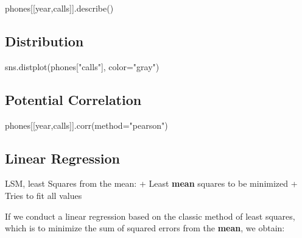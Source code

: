 \documentclass[
  letterpaper,
]{scrbook}
\newenvironment{Shaded}{\begin{snugshade}}{\end{snugshade}}
\newcommand{\NormalTok}[1]{\textcolor[rgb]{0.00,0.23,0.31}{#1}}
\newcommand{\OperatorTok}[1]{\textcolor[rgb]{0.37,0.37,0.37}{#1}}
\newcommand{\StringTok}[1]{\textcolor[rgb]{0.13,0.47,0.30}{#1}}
\begin{document}
\begin{Shaded}
\begin{Highlighting}[]
\NormalTok{phones[[}\StringTok{\textquotesingle{}year\textquotesingle{}}\NormalTok{,}\StringTok{\textquotesingle{}calls\textquotesingle{}}\NormalTok{]].describe()}
\end{Highlighting}
\end{Shaded}

\subsection*{Distribution}\label{distribution}

\begin{Shaded}
\begin{Highlighting}[]
\NormalTok{sns.distplot(phones[}\StringTok{"calls"}\NormalTok{], color}\OperatorTok{=}\StringTok{"gray"}\NormalTok{)}
\end{Highlighting}
\end{Shaded}

\subsection*{Potential Correlation}\label{potential-correlation}

\begin{Shaded}
\begin{Highlighting}[]
\NormalTok{phones[[}\StringTok{\textquotesingle{}year\textquotesingle{}}\NormalTok{,}\StringTok{\textquotesingle{}calls\textquotesingle{}}\NormalTok{]].corr(method}\OperatorTok{=}\StringTok{"pearson"}\NormalTok{)}
\end{Highlighting}
\end{Shaded}

\subsection*{Linear Regression}\label{linear-regression-1}

LSM, least Squares from the mean: + Least \textbf{mean} squares to be
minimized + Tries to fit all values

If we conduct a linear regression based on the classic method of least
squares, which is to minimize the sum of squared errors from the
\textbf{mean}, we obtain:
\end{document}
